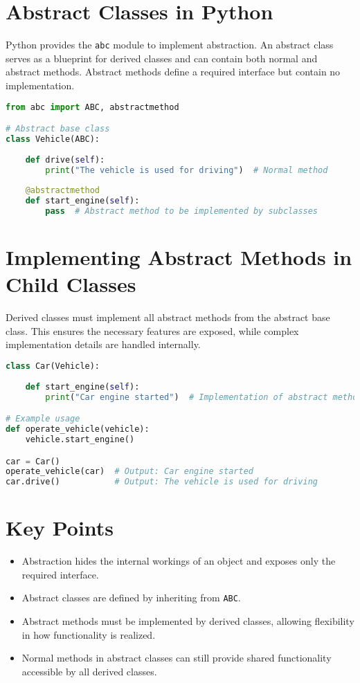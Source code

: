 \section{Abstract Classes in Python}

Python provides the \texttt{abc} module to implement abstraction. An abstract class serves as a blueprint for derived classes and can contain both normal and abstract methods. Abstract methods define a required interface but contain no implementation.

\begin{lstlisting}[language=Python, caption=Abstract Class and Method Example]
from abc import ABC, abstractmethod

# Abstract base class
class Vehicle(ABC):
    
    def drive(self):
        print("The vehicle is used for driving")  # Normal method
    
    @abstractmethod
    def start_engine(self):
        pass  # Abstract method to be implemented by subclasses
\end{lstlisting}

\section{Implementing Abstract Methods in Child Classes}

Derived classes must implement all abstract methods from the abstract base class. This ensures the necessary features are exposed, while complex implementation details are handled internally.

\begin{lstlisting}[language=Python, caption=Derived Class Implementing Abstract Method]
class Car(Vehicle):
    
    def start_engine(self):
        print("Car engine started")  # Implementation of abstract method

# Example usage
def operate_vehicle(vehicle):
    vehicle.start_engine()

car = Car()
operate_vehicle(car)  # Output: Car engine started
car.drive()           # Output: The vehicle is used for driving
\end{lstlisting}

\section{Key Points}

\begin{itemize}
    \item Abstraction hides the internal workings of an object and exposes only the required interface.
    \item Abstract classes are defined by inheriting from \texttt{ABC}.
    \item Abstract methods must be implemented by derived classes, allowing flexibility in how functionality is realized.
    \item Normal methods in abstract classes can still provide shared functionality accessible by all derived classes.
\end{itemize}

